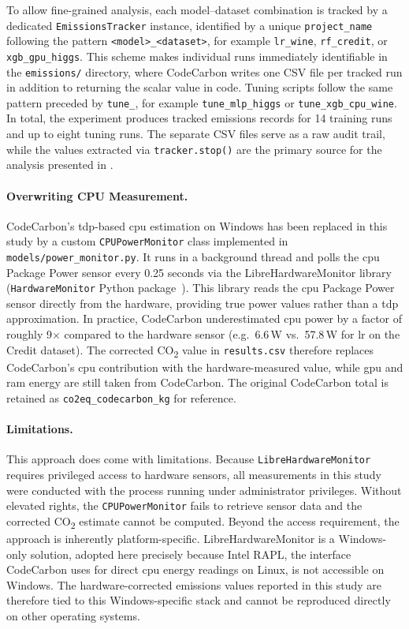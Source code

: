 To allow fine-grained analysis, each model--dataset combination is tracked by a dedicated \texttt{EmissionsTracker} instance, identified by a unique \texttt{project\_name} following the pattern \texttt{<model>\_<dataset>}, for example \texttt{lr\_wine}, \texttt{rf\_credit}, or \texttt{xgb\_gpu\_higgs}. This scheme makes individual runs immediately identifiable in the \texttt{emissions/} directory, where CodeCarbon writes one CSV file per tracked run in addition to returning the scalar value in code. Tuning scripts follow the same pattern preceded by \texttt{tune\_}, for example \texttt{tune\_mlp\_higgs} or \texttt{tune\_xgb\_cpu\_wine}. In total, the experiment produces tracked emissions records for 14 training runs and up to eight tuning runs. The separate CSV files serve as a raw audit trail, while the values extracted via \texttt{tracker.stop()} are the primary source for the analysis presented in .

\paragraph{Overwriting CPU Measurement.}
CodeCarbon's \gls{tdp}-based \gls{cpu} estimation on Windows has been replaced in this study by a custom \texttt{CPUPowerMonitor} class implemented in \texttt{models/power\_monitor.py}. It runs in a background thread and polls the \gls{cpu} Package Power sensor every 0.25 seconds via the LibreHardwareMonitor library (\texttt{HardwareMonitor} Python package~\cite{feixSnip3rnickPyHardwareMonitor2026}). This library reads the \gls{cpu} Package Power sensor directly from the hardware, providing true power values rather than a \gls{tdp} approximation. In practice, CodeCarbon underestimated \gls{cpu} power by a factor of roughly 9$\times$ compared to the hardware sensor (e.g.\ 6.6\,W vs.\ 57.8\,W for \gls{lr} on the Credit dataset). The corrected CO\textsubscript{2} value in \texttt{results.csv} therefore replaces CodeCarbon's \gls{cpu} contribution with the hardware-measured value, while \gls{gpu} and \gls{ram} energy are still taken from CodeCarbon. The original CodeCarbon total is retained as \texttt{co2eq\_codecarbon\_kg} for reference.

\paragraph{Limitations.}
This approach does come with limitations. Because \texttt{LibreHardwareMonitor} requires privileged access to hardware sensors, all measurements in this study were conducted with the process running under administrator privileges. Without elevated rights, the \texttt{CPUPowerMonitor} fails to retrieve sensor data and the corrected CO\textsubscript{2} estimate cannot be computed. Beyond the access requirement, the approach is inherently platform-specific. LibreHardwareMonitor is a Windows-only solution, adopted here precisely because Intel RAPL, the interface CodeCarbon uses for direct \gls{cpu} energy readings on Linux, is not accessible on Windows. The hardware-corrected emissions values reported in this study are therefore tied to this Windows-specific stack and cannot be reproduced directly on other operating systems.

